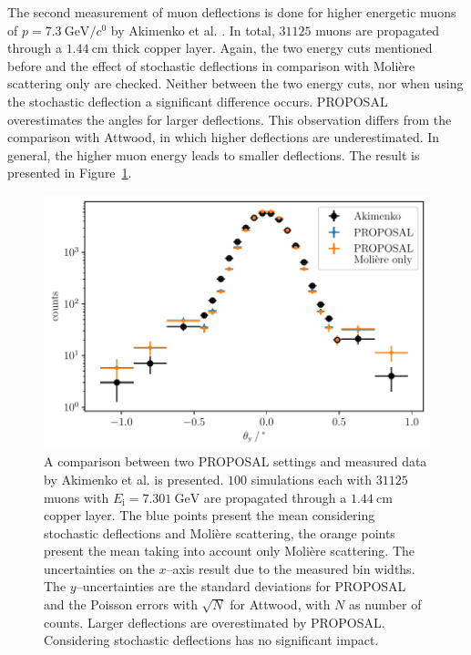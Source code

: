 The second measurement of muon deflections is done for higher energetic muons 
of $p = \SI[per-mode=symbol]{7.3}{\giga\electronvolt\per\clight}$ by Akimenko et al. \cite{akimenko_1984}.
In total, $\num{31125}$ muons are propagated through a $\SI{1.44}{\centi\meter}$ thick 
copper layer. Again, the two energy cuts mentioned before and the effect of stochastic deflections 
in comparison with Molière scattering only are checked. 
Neither between the two energy cuts, nor when using the stochastic deflection a significant difference occurs. 
PROPOSAL overestimates the angles for larger deflections. This observation differs from the comparison with Attwood, 
in which higher deflections are underestimated. In general, the higher muon energy 
leads to smaller deflections. The result is presented in Figure~\ref{fig:akimenko_comparison}.
\begin{figure}
    \centering 
    \includegraphics{../../deflection/plots/FINAL/akimenko_comparison_moliere_E7301MeV_final_multi_mean_deg.pdf}
    \caption{A comparison between two PROPOSAL settings and measured data by Akimenko et al. \cite{akimenko_1984} 
    is presented. $\num{100}$ simulations each with $\num{31125}$ muons with 
    $E_{\mathrm{i}} = \SI{7.301}{\giga\electronvolt}$ are propagated through a $\SI{1.44}{\centi\meter}$ 
    copper layer. The blue points present the mean considering stochastic deflections and Molière scattering, the orange points
    present the mean taking into account only Molière scattering. The uncertainties on the $x$--axis result due to the measured bin widths. The $y$--uncertainties are the standard deviations for PROPOSAL and the Poisson errors with $\sqrt{N}$ for Attwood, with $N$ as number of counts. Larger deflections are overestimated by PROPOSAL.
    Considering stochastic deflections has no significant impact.}
    \label{fig:akimenko_comparison}
\end{figure}

